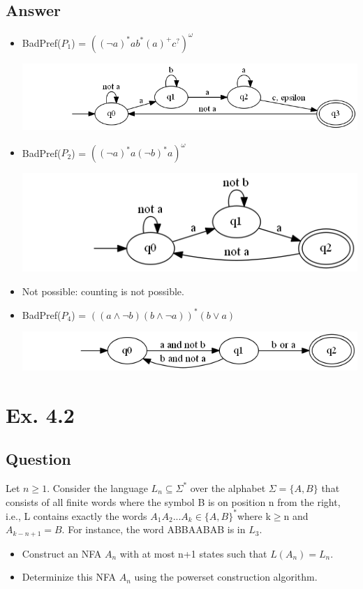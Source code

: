 \documentclass[12pt]{article}
\begin{document}
\subsection*{Answer}
\begin{itemize}
	\item BadPref($P_1$) = $((\neg a)^*ab^*(a)^+c^?)^\omega$\\
		\begin{centering}
			\includegraphics*[scale=0.5]{ex41a.png}
		\end{centering}
	\item BadPref($P_2$) = $((\neg a)^*a(\neg b)^*a)^\omega$\\
	\begin{centering}
		\includegraphics*[scale=0.5]{ex41b.png}
	\end{centering}
	\item Not possible: counting is not possible.
	\item BadPref($P_4$) = $((a\wedge \neg b)(b\wedge \neg a))^*(b\vee a)$\\
	\begin{centering}
		\includegraphics*[scale=0.7]{ex41d.png}
	\end{centering}
\end{itemize}

\newpage
\section*{Ex. 4.2}
\subsection*{Question}
Let $n \geq 1$. Consider the language $L_n \subseteq \Sigma ^*$ over the alphabet $\Sigma = \{A,B\}$ that
consists of all finite words where the symbol B is on position n from the right, i.e., L contains
exactly the words $A_1A_2...A_k \in \{A,B\}^*$where k$\geq$n and $A_{k−n+1} = B$. For instance, the word
ABBAABAB is in $L_3$.
\begin{itemize}
	\item Construct an NFA $A_n$ with at most n+1 states such that $L(A_n) = L_n$.
	\item Determinize this NFA $A_n$ using the powerset construction algorithm.
\end{itemize}
\end{document}

